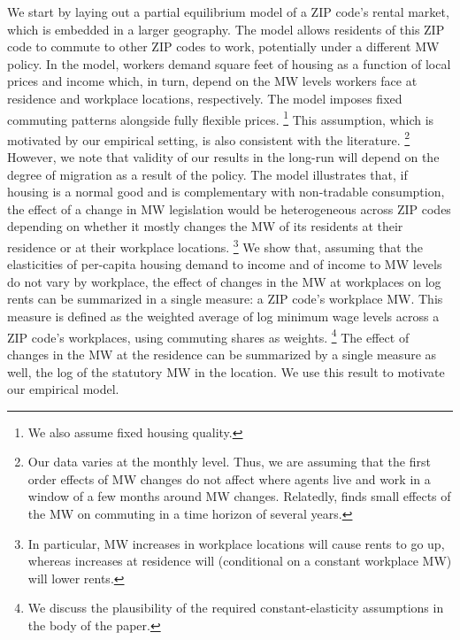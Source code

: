 We start by laying out a partial equilibrium model of a ZIP code's rental market,
which is embedded in a larger geography.
The model allows residents of this ZIP code to commute to other ZIP codes to 
work, potentially under a different MW policy.
In the model, workers demand square feet of housing as a function of local prices 
and income which, in turn, depend on the MW levels workers face at residence and 
workplace locations, respectively.
The model imposes fixed commuting patterns alongside fully flexible prices.%
\footnote{We also assume fixed housing quality.}
This assumption, which is motivated by our empirical setting, is also consistent 
with the literature.%
\footnote{Our data varies at the monthly level. 
Thus, we are assuming that the first order effects of MW changes do not affect 
where agents live and work in a window of a few months around MW changes.
Relatedly, \textcite{PerezPerez2021} finds small effects of the MW on commuting
in a time horizon of several years.}
However, we note that validity of our results in the long-run will depend on the
degree of migration as a result of the policy.
The model illustrates that, if housing is a normal good and is complementary 
with non-tradable consumption, the effect of a change in MW legislation 
would be heterogeneous across ZIP codes depending on whether it mostly changes 
the MW of its residents at their residence or at their workplace locations.%
\footnote{In particular, MW increases in workplace locations will cause rents to go up,
whereas increases at residence will (conditional on a constant workplace MW)
will lower rents.}
We show that, assuming that the elasticities of per-capita housing demand 
to income and of income to MW levels do not vary by workplace, the effect of 
changes in the MW at workplaces on log rents can be summarized in a single 
measure: a ZIP code's workplace MW.
This measure is defined as the weighted average of log minimum wage levels 
across a ZIP code's workplaces, using commuting shares as weights.%
\footnote{We discuss the plausibility of the required constant-elasticity 
assumptions in the body of the paper.}
The effect of changes in the MW at the residence can be summarized by
a single measure as well, the log of the statutory MW in the location.
We use this result to motivate our empirical model.


